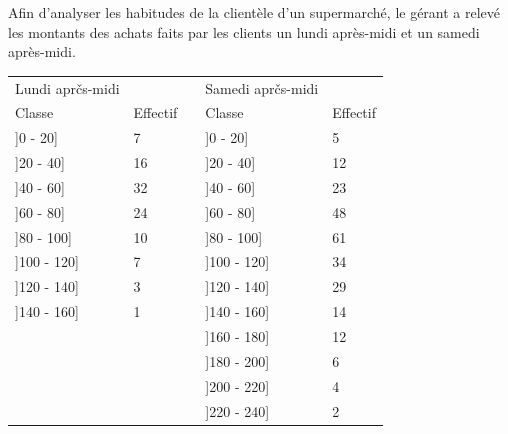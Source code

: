 \begin{exercice}
Afin d'analyser les habitudes de la clientèle d’un supermarché, le gérant a relevé les montants des achats faits par les clients un lundi après-midi et un samedi après-midi.

\begin{tabular}{lll|l|l|}
\cline{1-2} \cline{4-5}
\multicolumn{1}{|l|}{Lundi aprčs-midi} & \multicolumn{1}{l|}{}         &  & Samedi aprčs-midi &          \\ \cline{1-2} \cline{4-5} 
\multicolumn{1}{|l|}{Classe}           & \multicolumn{1}{l|}{Effectif} &  & Classe            & Effectif \\ \cline{1-2} \cline{4-5} 
\multicolumn{1}{|l|}{{]}0 - 20{]}}     & \multicolumn{1}{l|}{7}        &  & {]}0 - 20{]}      & 5        \\ \cline{1-2} \cline{4-5} 
\multicolumn{1}{|l|}{{]}20 - 40{]}}    & \multicolumn{1}{l|}{16}       &  & {]}20 - 40{]}     & 12       \\ \cline{1-2} \cline{4-5} 
\multicolumn{1}{|l|}{{]}40 - 60{]}}    & \multicolumn{1}{l|}{32}       &  & {]}40 - 60{]}     & 23       \\ \cline{1-2} \cline{4-5} 
\multicolumn{1}{|l|}{{]}60 - 80{]}}    & \multicolumn{1}{l|}{24}       &  & {]}60 - 80{]}     & 48       \\ \cline{1-2} \cline{4-5} 
\multicolumn{1}{|l|}{{]}80 - 100{]}}   & \multicolumn{1}{l|}{10}       &  & {]}80 - 100{]}    & 61       \\ \cline{1-2} \cline{4-5} 
\multicolumn{1}{|l|}{{]}100 - 120{]}}  & \multicolumn{1}{l|}{7}        &  & {]}100 - 120{]}   & 34       \\ \cline{1-2} \cline{4-5} 
\multicolumn{1}{|l|}{{]}120 - 140{]}}  & \multicolumn{1}{l|}{3}        &  & {]}120 - 140{]}   & 29       \\ \cline{1-2} \cline{4-5} 
\multicolumn{1}{|l|}{{]}140 - 160{]}}  & \multicolumn{1}{l|}{1}        &  & {]}140 - 160{]}   & 14       \\ \cline{1-2} \cline{4-5} 
                                       &                               &  & {]}160 - 180{]}   & 12       \\ \cline{4-5} 
                                       &                               &  & {]}180 - 200{]}   & 6        \\ \cline{4-5} 
                                       &                               &  & {]}200 - 220{]}   & 4        \\ \cline{4-5} 
                                       &                               &  & {]}220 - 240{]}   & 2        \\ \cline{4-5} 
\end{tabular}


\end{exercice}
